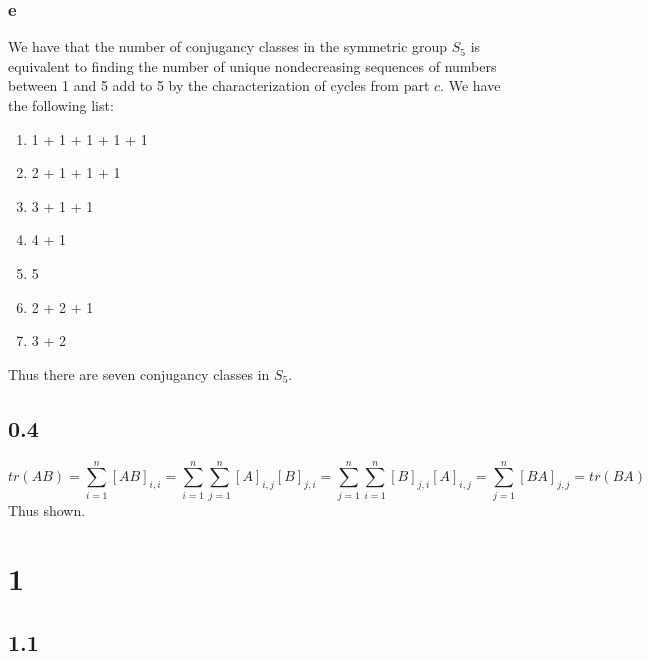 \documentclass[]{article}
\begin{document}
\subsubsection*{e}
We have that the number of conjugancy classes in the symmetric group $S_5$ is equivalent to finding the number of unique nondecreasing sequences of numbers between 1 and 5 add to 5 by the characterization of cycles from part $c$.
We have the following list:
\begin{enumerate}
	\item 1 + 1 + 1 + 1 + 1
	\item 2 + 1 + 1 + 1
	\item 3 + 1 + 1
	\item 4 + 1
	\item 5
	\item 2 + 2 + 1
	\item 3 + 2
\end{enumerate}
Thus there are seven conjugancy classes in $S_5$.

\subsection*{0.4}
\begin{equation*}
tr(AB) = \sum_{i = 1}^n [AB]_{i,i} = \sum_{i = 1}^n \sum_{j = 1}^n [A]_{i,j} [B]_{j, i } = \sum_{j = 1}^n\sum_{i = 1}^n  [B]_{j, i }[A]_{i,j}   = \sum_{j = 1}^n [BA]_{j,j} = tr(BA)
\end{equation*}
Thus shown. 
\section*{1}
\subsection*{1.1}
\end{document}
